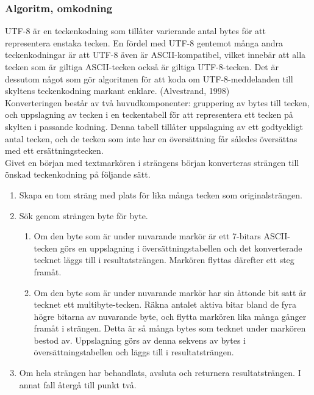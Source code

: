 \documentclass[a4paper,11pt]{article}
\begin{document}
\subsubsection{Algoritm, omkodning}
UTF-8 är en teckenkodning som tillåter varierande antal bytes för att representera enstaka tecken. En fördel med UTF-8 gentemot många andra teckenkodningar är att UTF-8 även är ASCII-kompatibel, vilket innebär att alla tecken som är giltiga ASCII-tecken också är giltiga UTF-8-tecken. Det är dessutom något som gör algoritmen för att koda om UTF-8-meddelanden till skyltens teckenkodning markant enklare. (Alvestrand, 1998)\\

Konverteringen består av två huvudkomponenter: gruppering av bytes till tecken, och uppslagning av tecken i en teckentabell för att representera ett tecken på skylten i passande kodning. Denna tabell tillåter uppslagning av ett godtyckligt antal tecken, och de tecken som inte har en översättning får således översättas med ett ersättningstecken.\\

Givet en början med textmarkören i strängens början konverteras strängen till önskad teckenkodning på följande sätt.
	
	\begin{enumerate}
    	\item Skapa en tom sträng med plats för lika många tecken som originalsträngen.
    	\item Sök genom strängen byte för byte.
    		\begin{enumerate}
        	\item Om den byte som är under nuvarande markör är ett 7-bitars ASCII-tecken görs en uppslagning i översättningstabellen och det konverterade tecknet läggs till i resultatsträngen. Markören flyttas därefter ett steg framåt.
        	\item Om den byte som är under nuvarande markör har sin åttonde bit satt är tecknet ett multibyte-tecken. Räkna antalet aktiva bitar bland de fyra högre bitarna av nuvarande byte, och flytta markören lika många gånger framåt i strängen. Detta är så många bytes som tecknet under markören bestod av. Uppslagning görs av denna sekvens av bytes i översättningstabellen och läggs till i resultatsträngen.
        	\end{enumerate}
    	\item Om hela strängen har behandlats, avsluta och returnera resultatsträngen. I annat fall återgå till punkt två.
	\end{enumerate}
	
\end{document}
